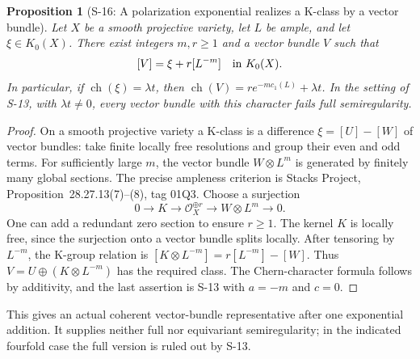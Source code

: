\documentclass[11pt,a4paper]{article}
\newtheorem{proposition}[theorem]{Proposition}
\theoremstyle{definition}
\begin{document}
\begin{proposition}[S-16: A polarization exponential realizes a K-class by a vector bundle]
\label{prop:semireg-kclass-bundle-realization}
Let $X$ be a smooth projective variety, let $L$ be ample, and let
$\xi\in K_0(X)$. There exist integers $m,r\geq1$ and a vector
bundle $V$ such that
\[
 [V]=\xi+r[L^{-m}]\quad\hbox{in }K_0(X).
\]
In particular, if $\operatorname{ch}(\xi)=\lambda t$, then
$\operatorname{ch}(V)=r e^{-m c_1(L)}+\lambda t$.
In the setting of S-13, with $\lambda t\ne0$, every vector bundle
with this character fails full semiregularity.
\end{proposition}
\begin{proof}
On a smooth projective variety a K-class is a difference
$\xi=[U]-[W]$ of vector bundles: take finite locally free
resolutions and group their even and odd terms.
For sufficiently large $m$, the vector bundle $W\otimes L^m$
is generated by finitely many global sections.
The precise ampleness criterion is Stacks Project,
Proposition~28.27.13(7)--(8), tag 01Q3.
Choose a surjection
\[
 0\longrightarrow K\longrightarrow\mathcal O_X^{\oplus r}
   \longrightarrow W\otimes L^m\longrightarrow0 .
\]
One can add a redundant zero section to ensure $r\geq1$.
The kernel $K$ is locally free, since the surjection onto a
vector bundle splits locally. After tensoring by $L^{-m}$,
the K-group relation is
$[K\otimes L^{-m}]=r[L^{-m}]-[W]$.
Thus $V=U\oplus(K\otimes L^{-m})$ has the required class.
The Chern-character formula follows by additivity, and the
last assertion is S-13 with $a=-m$ and $c=0$.
\end{proof}

This gives an actual coherent vector-bundle representative
after one exponential addition. It supplies neither full nor
equivariant semiregularity; in the indicated fourfold case the
full version is ruled out by S-13.
\end{document}
